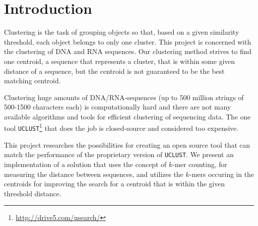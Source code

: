 \section{Introduction}
Clustering is the task of grouping objects so that, based on a given similarity
threshold, each object belongs to only one cluster.  This project is concerned
with the clustering of DNA and RNA sequences. Our clustering method strives to
find one centroid, a sequence that represents a cluster, that is within some
given distance of a sequence, but the centroid is not guaranteed to be the best
matching centroid.

Clustering huge amounts of DNA/RNA-sequences (up to 500 million strings of
500-1500 characters each) is computationally hard and there are not many
available algorithms and tools for efficient clustering of sequencing data. The
one tool \texttt{UCLUST}\footnote{\url{http://drive5.com/usearch/}} that does
the job is closed-source and considered too expensive.

This project researches the possibilities for creating an open source tool that
can match the performance of the proprietary version of \texttt{UCLUST}. We
present an implementation of a solution that uses the concept of $k$-mer
counting, for measuring the distance between sequences, and utilizes the
$k$-mers occuring in the centroids for improving the search for a centroid that
is within the given threshold distance.

